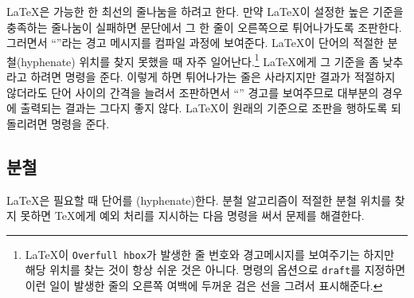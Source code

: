 \LaTeX 은 가능한 한 최선의 줄나눔을 하려고 한다. 만약 \LaTeX 이 설정한 높은 기준을 충족하는
줄나눔이 실패하면 문단에서 그 한 줄이 오른쪽으로 튀어나가도록 조판한다. 그러면서 ``''라는 
경고 메시지를 컴파일 과정에 보여준다. \LaTeX 이 단어의 적절한 분철(hyphenate) 위치를 찾지 못했을 때 자주 일어난다.\footnote{%
  \LaTeX 이 \texttt{Overfull \bs{}hbox}가 발생한 줄 번호와 경고메시지를 보여주기는 하지만
  해당 위치를 찾는 것이 항상 쉬운 것은 아니다.  명령의 옵션으로 \texttt{draft}를
  지정하면 이런 일이 발생한 줄의 오른쪽 여백에 두꺼운 검은 선을 그려서 표시해준다.
}
\LaTeX 에게 그 기준을 좀 낮추라고 하려면  명령을 준다. 이렇게 하면
튀어나가는 줄은 사라지지만 결과가 적절하지 않더라도 단어 사이의 간격을 늘려서 조판하면서 ``''
경고를 보여주므로 대부분의 경우에 출력되는 결과는 그다지 좋지 않다. 
\LaTeX 이 원래의 기준으로 조판을 행하도록 되돌리려면  명령을 준다.


\subsection{분철} \label{hyph}

\LaTeX 은 필요할 때 단어를 (hyphenate)한다. 분철 알고리즘이 적절한 분철 위치를 찾지 못하면
\TeX{}에게 예외 처리를 지시하는 다음 명령을 써서 문제를 해결한다.

